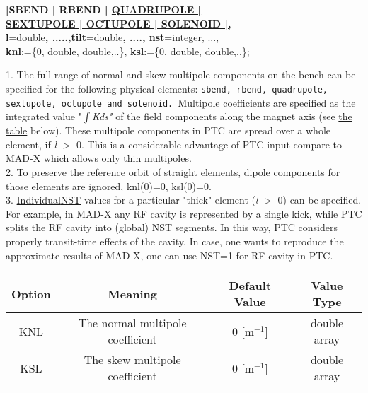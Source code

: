 \begin{description}
	\item[Additional Options for Physical Elements] 

	\item {\textbf{[SBEND | RBEND | \href{PTC_CREATE_LAYOUT0}{ QUADRUPOLE | \\ SEXTUPOLE | OCTUPOLE | SOLENOID ], }\\
 l}=double\textbf{, .....,tilt}=double\textbf{, ...., nst}=integer, ...,\\
 \textbf{knl}:=\{0, double, double,..\}, \textbf{ksl}:=\{0, double, double,..\};}

	\item[Description] 
	\text{ \\} %

	1. The full range of  normal and skew multipole components on the bench can be  specified for the following physical elements: \texttt{sbend, rbend, quadrupole, sextupole,  octupole and solenoid. }Multipole coefficients are specified as the integrated value "$\int$\textit{Kds"}  of the field components along the magnet axis (see \hyperlink{Multipoles_on_Bench_(PTC_only)}{the table} below). These multipole components in PTC are spread over a whole   element, if \textit{l }$>$ 0. This is a considerable advantage of PTC input compare  to MAD-X  which allows only \href{../Introduction/multipole.html}{ thin multipoles}.
\\ 2. To preserve the reference orbit of straight elements, dipole components  for those elements are   ignored, knl(0)=0, ksl(0)=0.
\\ 3. \href{individual}{Individual}\hyperlink{NST}{NST} values for a  particular "thick" element (\textit{l }$>$ 0) can be specified. For example,  in MAD-X any RF cavity is represented by a single kick, while  PTC splits the RF cavity into (global) NST segments. In this  way, PTC considers properly transit-time effects of the cavity.  In case, one wants to reproduce the approximate results of  MAD-X, one can use NST=1 for RF cavity in PTC.
	\item[Multipoles on Bench  (PTC only)] 
	\text{  \\}	%
	
\begin{tabular}{cccc}
\hline 
\textbf{Option} & \textbf{Meaning} & \textbf{Default Value} & \textbf{Value Type} \\ 
\hline
KNL & The normal multipole coefficient & 0 [m$^{-1}$]  & double array \\ 
\hline
KSL & The skew multipole coefficient & 0 [m$^{-1}$]  & double array \\ 
\hline
\end{tabular}


\end{description}
